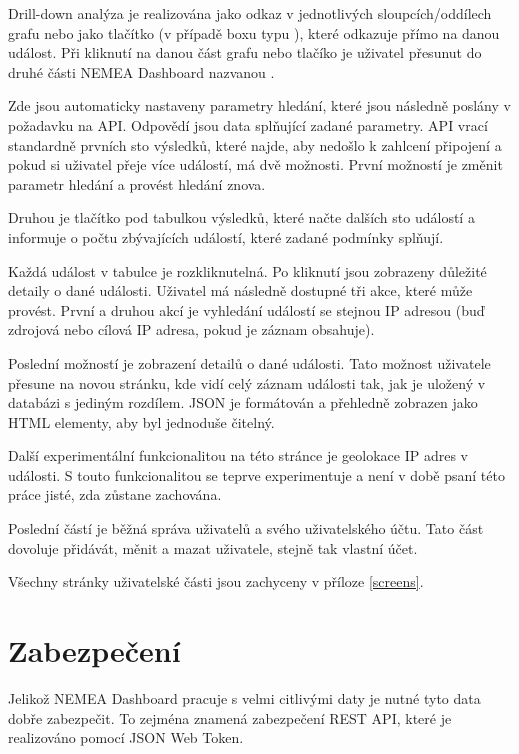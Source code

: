 Drill-down analýza je realizována jako odkaz v jednotlivých sloupcích/oddílech grafu nebo jako tlačítko (v případě boxu typu ), které odkazuje přímo na danou událost. Při kliknutí na danou část grafu nebo tlačíko je uživatel přesunut do druhé části NEMEA Dashboard nazvanou .

Zde jsou automaticky nastaveny parametry hledání, které jsou následně poslány v požadavku na API. Odpovědí jsou data splňující zadané parametry. API vrací standardně prvních sto výsledků, které najde, aby nedošlo k zahlcení připojení a pokud si uživatel přeje více událostí, má dvě možnosti. První možností je změnit parametr hledání a provést hledání znova.

Druhou je tlačítko pod tabulkou výsledků, které načte dalších sto událostí a informuje o počtu zbývajících událostí, které zadané podmínky splňují.

Každá událost v tabulce je rozkliknutelná. Po kliknutí jsou zobrazeny důležité detaily o dané události. Uživatel má následně dostupné tři akce, které může provést. První a druhou akcí je vyhledání událostí se stejnou IP adresou (buď zdrojová nebo cílová IP adresa, pokud je záznam obsahuje).

Poslední možností je zobrazení detailů o dané události. Tato možnost uživatele přesune na novou stránku, kde vidí celý záznam události tak, jak je uložený v databázi s jediným rozdílem. JSON je formátován a přehledně zobrazen jako HTML elementy, aby byl jednoduše čitelný.

Další experimentální funkcionalitou na této stránce je geolokace IP adres v události. S touto funkcionalitou se teprve experimentuje a není v době psaní této práce jisté, zda zůstane zachována.

Poslední částí je běžná správa uživatelů a svého uživatelského účtu. Tato část dovoluje přidávát, měnit a mazat uživatele, stejně tak vlastní účet.

Všechny stránky uživatelské části jsou zachyceny v příloze \ref{screens}.

\section{Zabezpečení}
\label{zabezpeceni}

Jelikož NEMEA Dashboard pracuje s velmi citlivými daty je nutné tyto data dobře zabezpečit. To zejména znamená zabezpečení REST API, které je realizováno pomocí JSON Web Token.

